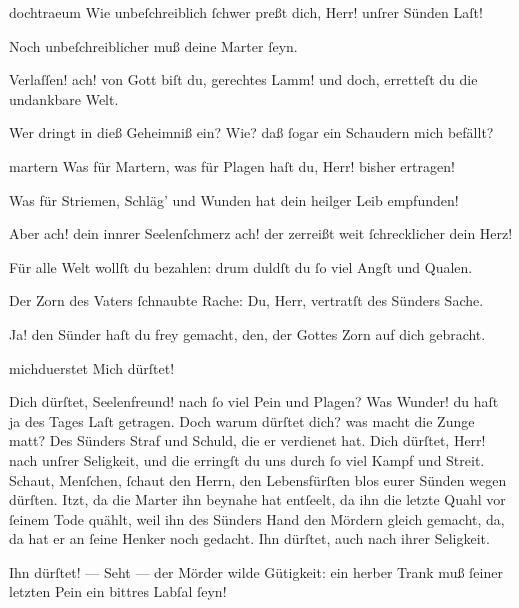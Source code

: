 \documentclass{ees}
\begin{document}
{\begin{movement}{dochtraeum}
    \voice[Lazarus]
    Wie unbeſchreiblich ſchwer preßt dich, Herr! unſrer Sünden Laſt!

    \voice[Eidli]
    Noch unbeſchreiblicher muß deine Marter ſeyn.

    Verlaſſen! ach! von Gott biſt du, gerechtes Lamm!
    und doch, erretteſt du die undankbare Welt.

    Wer dringt in dieß Geheimniß ein?
    Wie? daß ſogar ein Schaudern mich befällt?
  \end{movement}

  \begin{movement}{martern}
    \voice[Maria]
    Was für Martern, was für Plagen
    haſt du, Herr! bisher ertragen!

    \voice[Johannes]
    Was für Striemen, Schläg’ und Wunden
    hat dein heilger Leib empfunden!

    Aber ach! dein innrer Seelenſchmerz
    ach! der zerreißt weit ſchrecklicher dein Herz!

    \voice[Maria]
    Für alle Welt wollſt du bezahlen:
    drum duldſt du ſo viel Angſt und Qualen.

    \voice[Johannes]
    Der Zorn des Vaters ſchnaubte Rache:
    Du, Herr, vertratſt des Sünders Sache.

    Ja! den Sünder haſt du frey gemacht,
    den, der Gottes Zorn auf dich gebracht.
  \end{movement}

  \begin{movement}{michduerstet}
    \voice[Jeſus]
    Mich dürſtet!

    \voice[Johannes]
    Dich dürſtet, Seelenfreund! nach ſo viel Pein und Plagen?
    Was Wunder! du haſt ja des Tages Laſt getragen.
    Doch warum dürſtet dich? was macht die Zunge matt?
    Des Sünders Straf und Schuld, die er verdienet hat.
    Dich dürſtet, Herr! nach unſrer Seligkeit,
    und die erringſt du uns durch ſo viel Kampf und Streit.
    Schaut, Menſchen, ſchaut den Herrn, den Lebensfürſten
    blos eurer Sünden wegen dürſten.
    Itzt, da die Marter ihn beynahe hat entſeelt,
    da ihn die letzte Quahl vor ſeinem Tode quählt,
    weil ihn des Sünders Hand den Mördern gleich gemacht,
    da, da hat er an ſeine Henker noch gedacht.
    Ihn dürſtet, auch nach ihrer Seligkeit.

    \voice[Maria]
    Ihn dürſtet! — Seht — der Mörder wilde Gütigkeit:
    ein herber Trank muß ſeiner letzten Pein
    ein bittres Labſal ſeyn!
  \end{movement}

}
\end{document}
